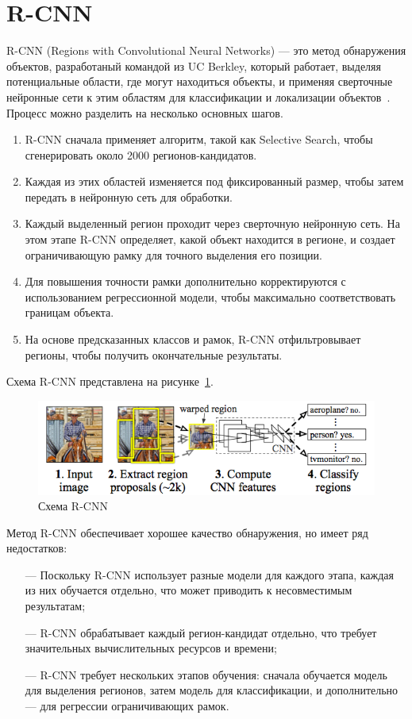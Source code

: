 \section{R-CNN}

R-CNN (Regions with Convolutional Neural Networks) — это метод обнаружения объектов, разработаный командой из UC Berkley, который работает, выделяя потенциальные области, где могут находиться объекты, и применяя сверточные нейронные сети к этим областям для классификации и локализации объектов~\cite{r-cnn}. Процесс можно разделить на несколько основных шагов.

\begin{enumerate}
    \item R-CNN сначала применяет алгоритм, такой как Selective Search, чтобы сгенерировать около 2000 регионов-кандидатов.
    \item Каждая из этих областей изменяется под фиксированный размер, чтобы затем передать в нейронную сеть для обработки.
    \item Каждый выделенный регион проходит через сверточную нейронную сеть. На этом этапе R-CNN определяет, какой объект находится в регионе, и создает ограничивающую рамку для точного выделения его позиции.
    \item Для повышения точности рамки дополнительно корректируются с использованием регрессионной модели, чтобы максимально соответствовать границам объекта.
    \item На основе предсказанных классов и рамок, R-CNN отфильтровывает регионы, чтобы получить окончательные результаты.
\end{enumerate}

Схема R-CNN представлена на рисунке~\ref{r-cnn_sheme}.

\begin{figure}[H]
    \centering
    \includegraphics[width=0.8\linewidth]{images/r-cnn.png}
    \caption{Схема R-CNN}
    \label{r-cnn_sheme}
\end{figure}

Метод R-CNN обеспечивает хорошее качество обнаружения, но имеет ряд недостатков:

\begin{itemize}
    \item[---] Поскольку R-CNN использует разные модели для каждого этапа, каждая из них обучается отдельно, что может приводить к несовместимым результатам;
    \item[---] R-CNN обрабатывает каждый регион-кандидат отдельно, что требует значительных вычислительных ресурсов и времени;
    \item[---] R-CNN требует нескольких этапов обучения: сначала обучается модель для выделения регионов, затем модель для классификации, и дополнительно — для регрессии ограничивающих рамок.
\end{itemize}

